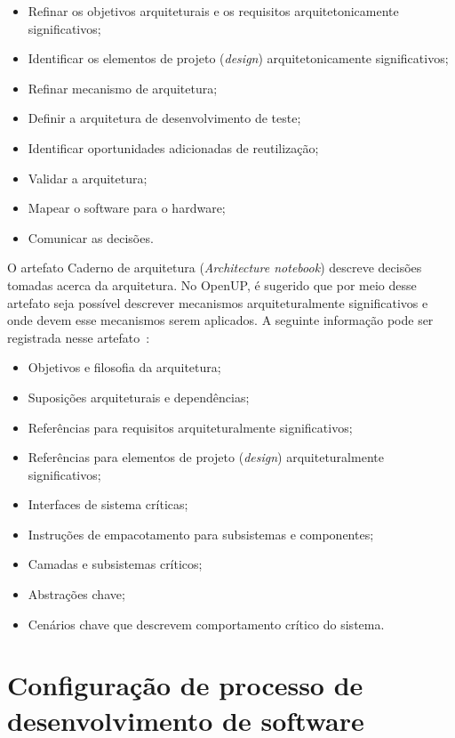 \begin{itemize}
    \item Refinar os objetivos arquiteturais e os requisitos arquitetonicamente significativos;
    \item Identificar os elementos de projeto (\emph{design}) arquitetonicamente significativos;
    \item Refinar mecanismo de arquitetura;
    \item Definir a arquitetura de desenvolvimento de teste;
    \item Identificar oportunidades adicionadas de reutilização;
    \item Validar a arquitetura;
    \item Mapear o software para o hardware;
    \item Comunicar as decisões.
\end{itemize}

O artefato Caderno de arquitetura (\emph{Architecture notebook}) descreve decisões  tomadas acerca da arquitetura. No OpenUP, é sugerido que por meio desse artefato seja possível descrever mecanismos arquiteturalmente significativos e onde devem esse mecanismos serem aplicados. A seguinte informação pode ser registrada nesse artefato~\cite{openup}:

\begin{itemize}
    \item Objetivos e filosofia da arquitetura;
    \item Suposições arquiteturais e dependências;
    \item Referências para requisitos arquiteturalmente significativos;
    \item Referências para elementos de projeto (\emph{design}) arquiteturalmente significativos;
    \item Interfaces de sistema críticas;
    \item Instruções de empacotamento para subsistemas e componentes;
    \item Camadas e subsistemas críticos;
    \item Abstrações chave;
    \item Cenários chave que descrevem comportamento crítico do sistema.

\end{itemize}

\section{Configuração de processo de desenvolvimento de software}

